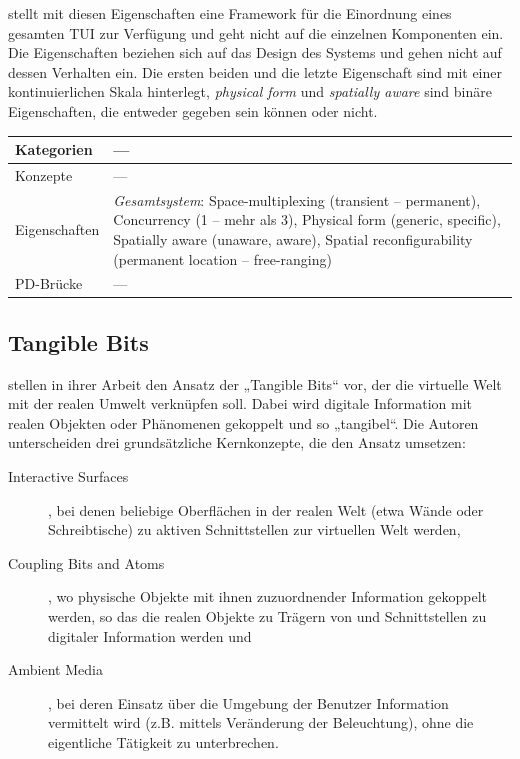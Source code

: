 \citeauthor{Fitzmaurice96} stellt mit diesen Eigenschaften eine Framework für die Einordnung eines gesamten \gls{TUI} zur Verfügung und geht nicht auf die einzelnen Komponenten ein. Die Eigenschaften beziehen sich auf das Design des Systems und gehen nicht auf dessen Verhalten ein. Die ersten beiden und die letzte Eigenschaft sind mit einer kontinuierlichen Skala hinterlegt, \emph{physical form} und \emph{spatially aware} sind binäre Eigenschaften, die entweder gegeben sein können oder nicht.

\begin{tabular}{| p{3cm} | p{10cm} |}
  \hline
  Kategorien & --- \\ \hline
  Konzepte & --- \\ \hline
  Eigenschaften & \emph{Gesamtsystem}: Space-multiplexing (transient -- permanent), Concurrency (1 -- mehr als 3), Physical form (generic, specific), Spatially aware (unaware, aware), Spatial reconfigurability (permanent location -- free-ranging) \\ \hline
  PD-Brücke & --- \\ \hline
\end{tabular} 


\subsection{Tangible Bits} %
\label{sub:tangible_bits}

\citet{Ishii97} stellen in ihrer Arbeit den Ansatz der „Tangible Bits“ vor, der die virtuelle Welt mit der realen Umwelt verknüpfen soll. Dabei wird digitale Information mit realen Objekten oder Phänomenen gekoppelt und so „tangibel“. Die Autoren unterscheiden drei grundsätzliche Kernkonzepte, die den Ansatz umsetzen:
\begin{description}
	\item[Interactive Surfaces], bei denen beliebige Oberflächen in der realen Welt (etwa Wände oder Schreibtische) zu aktiven Schnittstellen zur virtuellen Welt werden,
	\item[Coupling Bits and Atoms], wo physische Objekte mit ihnen zuzuordnender Information gekoppelt werden, so das die realen Objekte zu Trägern von und Schnittstellen zu digitaler Information werden und
	\item[Ambient Media], bei deren Einsatz über die Umgebung der Benutzer Information vermittelt wird (z.B. mittels Veränderung der Beleuchtung), ohne die eigentliche Tätigkeit zu unterbrechen. 
\end{description}

